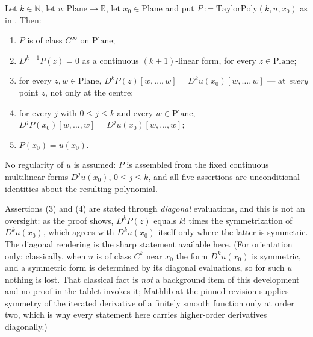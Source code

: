 \begin{lemma}
Let $k\in\mathbb{N}$, let $u\colon\mathrm{Plane}\to\mathbb{R}$, let $x_0\in\mathrm{Plane}$ and
put $P:=\mathrm{TaylorPoly}(k,u,x_0)$ as in .  Then:
\begin{enumerate}
\item $P$ is of class $C^{\infty}$ on $\mathrm{Plane}$;
\item $D^{k+1}P(z)=0$ as a continuous $(k+1)$-linear form, for every $z\in\mathrm{Plane}$;
\item for every $z,w\in\mathrm{Plane}$,
  $D^{k}P(z)[w,\ldots,w]=D^{k}u(x_0)[w,\ldots,w]$ --- at \emph{every} point $z$, not only at
  the centre;
\item for every $j$ with $0\le j\le k$ and every $w\in\mathrm{Plane}$,
  $D^{j}P(x_0)[w,\ldots,w]=D^{j}u(x_0)[w,\ldots,w]$;
\item $P(x_0)=u(x_0)$.
\end{enumerate}
No regularity of $u$ is assumed: $P$ is assembled from the fixed continuous multilinear forms
$D^{j}u(x_0)$, $0\le j\le k$, and all five assertions are unconditional identities about the
resulting polynomial.

Assertions (3) and (4) are stated through \emph{diagonal} evaluations, and this is not an
oversight: as the proof shows, $D^{k}P(z)$ equals $k!$ times the symmetrization of
$D^{k}u(x_0)$, which agrees with $D^{k}u(x_0)$ itself only where the latter is symmetric.  The
diagonal rendering is the sharp statement available here.  (For orientation only: classically,
when $u$ is of class $C^{k}$ near $x_0$ the form $D^{k}u(x_0)$ is symmetric, and a symmetric
form is determined by its diagonal evaluations, so for such $u$ nothing is lost.  That
classical fact is \emph{not} a background item of this development and no proof in the tablet
invokes it; Mathlib at the pinned revision supplies symmetry of the iterated derivative of a
finitely smooth function only at order two, which is why every statement here carries
higher-order derivatives diagonally.)
\end{lemma}
